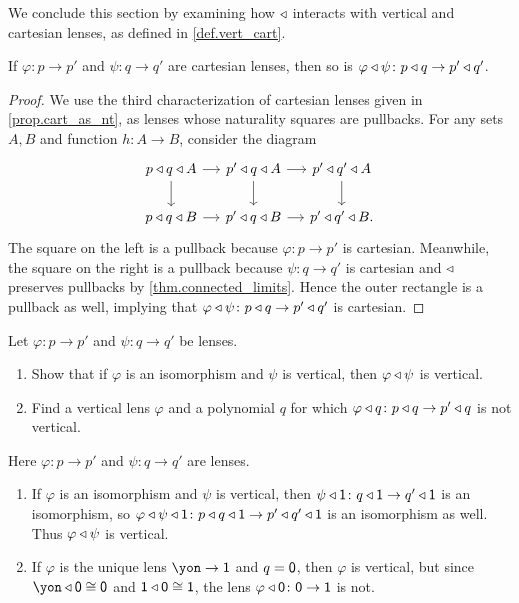 \documentclass[Book-Poly]{subfiles}
\begin{document}
We conclude this section by examining how $\mathbin{\triangleleft}$ interacts with vertical and cartesian lenses, as defined in \cref{def.vert_cart}.

\begin{proposition}\label{prop.comp_pres_cart}
If $\varphi\colon p\to p'$ and $\psi\colon q\to q'$ are cartesian lenses, then so is $\varphi\mathbin{\triangleleft} \psi\colon p\mathbin{\triangleleft} q \to p'\mathbin{\triangleleft} q'$.
\end{proposition}
\begin{proof}
We use the third characterization of cartesian lenses given in \cref{prop.cart_as_nt}, as lenses whose naturality squares are pullbacks.
For any sets $A,B$ and function $h\colon A\to B$, consider the diagram
\[
\begin{tikzcd}[column sep=small]
    p\tri q\tri A\ar[r]\ar[d] & p'\tri q\tri A\ar[r]\ar[d] & p'\tri q'\tri A\ar[d] \\
    p\tri q\tri B\ar[r] & p'\tri q\tri B\ar[r] & p'\tri q'\tri B.
\end{tikzcd}
\]
The square on the left is a pullback because $\varphi\colon p\to p'$ is cartesian.
Meanwhile, the square on the right is a pullback because $\psi\colon q\to q'$ is cartesian and $\mathbin{\triangleleft}$ preserves pullbacks by \cref{thm.connected_limits}.
Hence the outer rectangle is a pullback as well, implying that $\varphi\mathbin{\triangleleft} \psi\colon p\mathbin{\triangleleft} q \to p'\mathbin{\triangleleft} q'$ is cartesian.
\end{proof}

\begin{exercise}
Let $\varphi\colon p\to p'$ and $\psi\colon q\to q'$ be lenses.
\begin{enumerate}
	\item Show that if $\varphi$ is an isomorphism and $\psi$ is vertical, then $\varphi\mathbin{\triangleleft} \psi$ is vertical.
	\item Find a vertical lens $\varphi$ and a polynomial $q$ for which $\varphi\mathbin{\triangleleft} q\colon p\mathbin{\triangleleft} q\to p'\mathbin{\triangleleft} q$ is not vertical.
\qedhere
\end{enumerate}
\begin{solution}
Here $\varphi\colon p\to p'$ and $\psi\colon q\to q'$ are lenses.
\begin{enumerate}
    \item If $\varphi$ is an isomorphism and $\psi$ is vertical, then $\psi\mathbin{\triangleleft}\textsf{1}\colon q\mathbin{\triangleleft}\textsf{1}\to q'\mathbin{\triangleleft}\textsf{1}$ is an isomorphism, so $\varphi\mathbin{\triangleleft} \psi\mathbin{\triangleleft}\textsf{1}\colon p\mathbin{\triangleleft} q\mathbin{\triangleleft}\textsf{1}\to p'\mathbin{\triangleleft} q'\mathbin{\triangleleft}\textsf{1}$ is an isomorphism as well.
    Thus $\varphi\mathbin{\triangleleft} \psi$ is vertical.
    \item If $\varphi$ is the unique lens $\yon\to\1$ and $q=\textsf{0}$, then $\varphi$ is vertical, but since $\yon\tri\0\iso\0$ and $\textsf{1}\mathbin{\triangleleft}\textsf{0}\cong\textsf{1}$, the lens $\varphi\mathbin{\triangleleft}\textsf{0}\colon\textsf{0}\to\textsf{1}$ is not.
\end{enumerate}
\end{solution}
\end{exercise}
\end{document}
